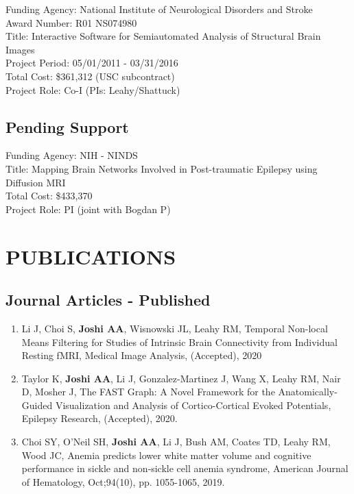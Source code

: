 \documentclass[overlapped,line,letterpaper]{res}
\begin{document}
\begin{resume}
Funding Agency: National Institute of Neurological Disorders and Stroke\\
Award Number: R01 NS074980 \\
Title: Interactive Software for Semiautomated Analysis of Structural Brain  Images \\
Project Period: 05/01/2011 - 03/31/2016 \\
Total Cost: \$361,312 (USC subcontract) \\
Project Role: Co-I (PIs: Leahy/Shattuck) \\

\subsection{Pending Support}

Funding Agency: NIH - NINDS\\
Title: Mapping Brain Networks Involved in Post-traumatic Epilepsy using Diffusion MRI \\
Total Cost:  \$433,370 \\
Project Role: PI (joint with Bogdan P)\\

\newpage
\section{PUBLICATIONS}
\subsection{Journal Articles -  Published}
\begin{enumerate}
    \item Li J, Choi S, \textbf{Joshi AA}, Wisnowski JL, Leahy RM, {Temporal Non-local Means Filtering for Studies of Intrinsic Brain Connectivity from Individual Resting fMRI}, Medical Image Analysis, (Accepted), 2020
    
    \item Taylor K, \textbf{Joshi AA}, Li J, Gonzalez-Martinez J, Wang X, Leahy RM, Nair D, Mosher J, {The FAST Graph: A Novel Framework for the Anatomically-Guided Visualization and Analysis of Cortico-Cortical Evoked Potentials}, Epilepsy Research, (Accepted), 2020.

    \item  Choi SY, O'Neil SH, \textbf{Joshi AA}, Li J, Bush AM, Coates TD, Leahy RM, Wood JC, {Anemia predicts lower white matter volume and cognitive performance in sickle and non‐sickle cell anemia syndrome}, American Journal of Hematology, Oct;94(10), pp. 1055-1065, 2019.


\end{enumerate}
\end{resume}
\end{document}
